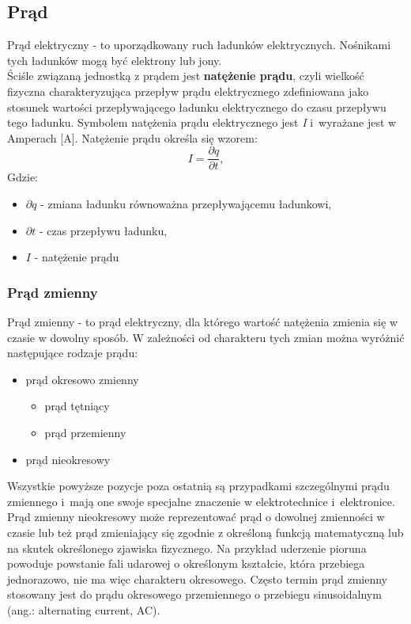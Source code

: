 \documentclass[12pt]{article}
\begin{document}
\subsection{Prąd}
Prąd elektryczny - to uporządkowany ruch ładunków elektrycznych. Nośnikami tych ładunków mogą być elektrony lub jony.\\
Ściśle związaną jednostką z prądem jest \textbf{natężenie prądu}, czyli wielkość fizyczna charakteryzująca przepływ prądu elektrycznego zdefiniowana jako stosunek wartości przepływającego ładunku elektrycznego do czasu przepływu tego ładunku.
Symbolem natężenia prądu elektrycznego jest \textit{I} i~wyrażane jest w Amperach [A]. Natężenie prądu określa się wzorem:
\begin{equation}
    I = \frac{\partial{q}}{\partial{t}},
\end{equation}
Gdzie:
    \begin{itemize}[noitemsep]
        \item $\partial{q}$ - zmiana ładunku równoważna przepływającemu ładunkowi,
        \item $\partial{t}$ - czas przepływu ładunku,
        \item $I$ - natężenie prądu
    \end{itemize}
\subsubsection{Prąd zmienny}
Prąd zmienny - to prąd elektryczny, dla którego wartość natężenia zmienia się w czasie w dowolny sposób. W zależności od charakteru tych zmian można wyróżnić następujące rodzaje prądu:
\begin{itemize}[noitemsep]
    \item prąd okresowo zmienny
    \begin{itemize}[noitemsep]
        \item prąd tętniący
        \item prąd przemienny
    \end{itemize}
    \item prąd nieokresowy
\end{itemize}

Wszystkie powyższe pozycje poza ostatnią są przypadkami szczególnymi prądu zmiennego i~mają one swoje specjalne znaczenie w elektrotechnice i~elektronice. Prąd zmienny nieokresowy może reprezentować prąd o dowolnej zmienności w czasie lub też prąd zmieniający się zgodnie z określoną funkcją matematyczną lub na skutek określonego zjawiska fizycznego. Na przykład uderzenie pioruna powoduje powstanie fali udarowej o określonym kształcie, która przebiega jednorazowo, nie ma więc charakteru okresowego. Często termin prąd zmienny stosowany jest do prądu okresowego przemiennego o przebiegu sinusoidalnym (ang.: alternating current, AC).\\
\end{document}
